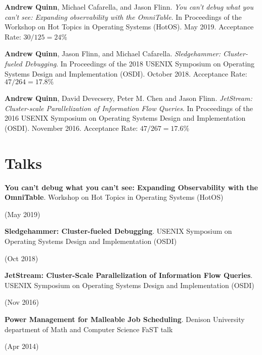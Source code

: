 \documentclass[letterpaper,10pt]{article}
\newcommand{\sidebyside}[2]{
  \begin{minipage}[t]{.75\textwidth}
    \raggedright{}
    #2
  \end{minipage}
  \hspace{.01\textwidth}
    \begin{minipage}[t]{.205\textwidth}
    \raggedleft
    #1
  \end{minipage}
}
\newcommand{\paper}[3]{#1. #2 #3}
\newcommand{\trio}[3]{\sidebyside{#3}{\textbf{#1}. #2}}
\begin{document}
\begin{smenumerate}
  \item \paper{\textbf{Andrew Quinn}, Michael Cafarella, and Jason
    Flinn}{\emph{You can't debug what you can't see: Expanding
    observability with the OmniTable}. In Proceedings of the Workshop
    on Hot Topics in Operating Systems (HotOS).  May 2019.}{Acceptance
    Rate: $30/125=24\%$}

  \item \paper{\textbf{Andrew Quinn}, Jason Flinn, and Michael Cafarella}{
    \emph{Sledgehammer: Cluster-fueled Debugging}.  In Proceedings of the 2018
    USENIX Symposium on Operating Systems Design and Implementation (OSDI).
    October 2018.}{Acceptance Rate: $47/264 = 17.8\%$}

  \item \paper{\textbf{Andrew Quinn}, David Devecsery, Peter M. Chen and Jason
    Flinn}{\emph{JetStream: Cluster-scale Parallelization of Information
    Flow Queries}.  In Proceedings of the 2016 USENIX Symposium on
    Operating Systems Design and Implementation (OSDI). November
    2016.}{Acceptance Rate: $47/267=17.6\%$}
\end{smenumerate}

\section{Talks}
\begin{smenumerate}
\item\trio{You can't debug what you can't see: Expanding Observability with the
  OmniTable}{Workshop on Hot Topics in Operating Systems (HotOS)}{(May 2019)}

\item\trio{Sledgehammer: Cluster-fueled Debugging}{USENIX Symposium on Operating
  Systems Design and Implementation (OSDI)}{(Oct 2018)}

\item\trio{JetStream: Cluster-Scale Parallelization of Information Flow
  Queries}{USENIX Symposium on Operating Systems Design and Implementation
  (OSDI)}{(Nov 2016)}

\item\trio{Power Management for Malleable Job Scheduling}{Denison University
  department of Math and Computer Science FaST talk}{(Apr 2014)}
\end{smenumerate}
\end{document}
